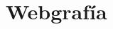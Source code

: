 \section{Webgrafía} 
\textbf{}\\
\begin{flushleft}

\begin{itemize}

\end{itemize} 


\end{flushleft}